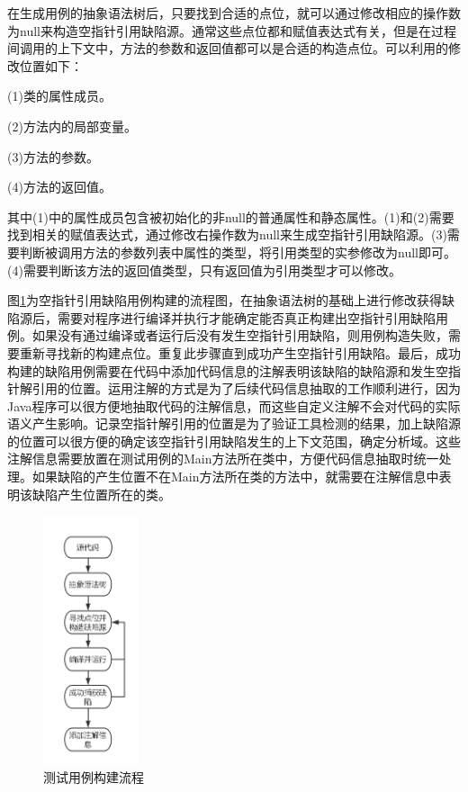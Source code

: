 在生成用例的抽象语法树后，只要找到合适的点位，就可以通过修改相应的操作数为null来构造空指针引用缺陷源。通常这些点位都和赋值表达式有关，但是在过程间调用的上下文中，方法的参数和返回值都可以是合适的构造点位。可以利用的修改位置如下：

(1)类的属性成员。

(2)方法内的局部变量。

(3)方法的参数。

(4)方法的返回值。

其中(1)中的属性成员包含被初始化的非null的普通属性和静态属性。(1)和(2)需要找到相关的赋值表达式，通过修改右操作数为null来生成空指针引用缺陷源。(3)需要判断被调用方法的参数列表中属性的类型，将引用类型的实参修改为null即可。(4)需要判断该方法的返回值类型，只有返回值为引用类型才可以修改。

图\ref{fig:figure4-3}为空指针引用缺陷用例构建的流程图，在抽象语法树的基础上进行修改获得缺陷源后，需要对程序进行编译并执行才能确定能否真正构建出空指针引用缺陷用例。如果没有通过编译或者运行后没有发生空指针引用缺陷，则用例构造失败，需要重新寻找新的构建点位。重复此步骤直到成功产生空指针引用缺陷。最后，成功构建的缺陷用例需要在代码中添加代码信息的注解表明该缺陷的缺陷源和发生空指针解引用的位置。运用注解的方式是为了后续代码信息抽取的工作顺利进行，因为Java程序可以很方便地抽取代码的注解信息，而这些自定义注解不会对代码的实际语义产生影响。记录空指针解引用的位置是为了验证工具检测的结果，加上缺陷源的位置可以很方便的确定该空指针引用缺陷发生的上下文范围，确定分析域。这些注解信息需要放置在测试用例的Main方法所在类中，方便代码信息抽取时统一处理。如果缺陷的产生位置不在Main方法所在类的方法中，就需要在注解信息中表明该缺陷产生位置所在的类。

\begin{figure}
	\centering
	\includegraphics[width=0.25\textwidth]{figures/parse4-3}
	\caption{测试用例构建流程}\label{fig:figure4-3}
\end{figure}

